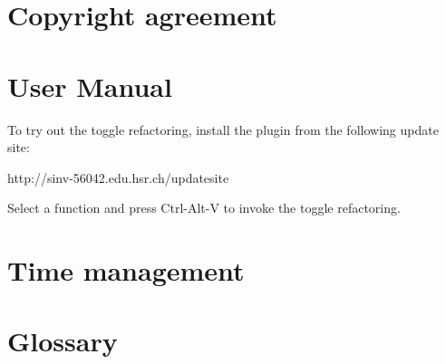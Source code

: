\documentclass[a4paper,12pt]{scrreprt}
\begin{document}
\chapter{Copyright agreement}
\thispagestyle{fancy}

\thispagestyle{fancy}
\chapter{User Manual}
To try out the toggle refactoring, install the plugin from the following update 
site:

http://sinv-56042.edu.hsr.ch/updatesite

Select a function and press Ctrl-Alt-V to invoke the toggle refactoring.

\thispagestyle{fancy}
\chapter{Time management}

\thispagestyle{fancy}
\chapter{Glossary}

\thispagestyle{fancy}


\end{document}
